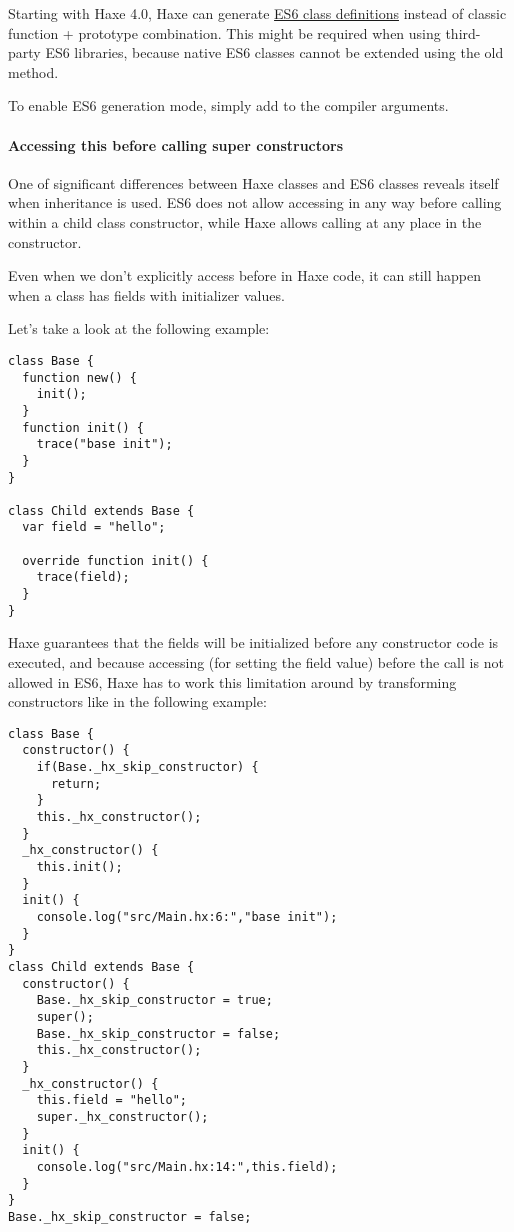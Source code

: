 
Starting with Haxe 4.0, Haxe can generate \href{https://developer.mozilla.org/en-US/docs/Web/JavaScript/Reference/Classes}{ES6 class definitions} instead of classic function + prototype combination. This might be required when using third-party ES6 libraries, because native ES6 classes cannot be extended using the old method.

To enable ES6 generation mode, simply add  to the compiler arguments.

\paragraph{Accessing this before calling super constructors}

One of significant differences between Haxe classes and ES6 classes reveals itself when inheritance is used. ES6 does not allow accessing  in any way before calling  within a child class constructor, while Haxe allows calling  at any place in the constructor.

Even when we don't explicitly access  before  in Haxe code, it can still happen when a class has fields with initializer values.

Let's take a look at the following example:

\begin{lstlisting}
class Base {
  function new() {
    init();
  }
  function init() {
    trace("base init");
  }
}

class Child extends Base {
  var field = "hello";

  override function init() {
    trace(field);
  }
}
\end{lstlisting}

Haxe guarantees that the fields will be initialized before any constructor code is executed, and because accessing  (for setting the field value) before the  call is not allowed in ES6, Haxe has to work this limitation around by transforming constructors like in the following example:

\begin{lstlisting}
class Base {
  constructor() {
    if(Base._hx_skip_constructor) {
      return;
    }
    this._hx_constructor();
  }
  _hx_constructor() {
    this.init();
  }
  init() {
    console.log("src/Main.hx:6:","base init");
  }
}
class Child extends Base {
  constructor() {
    Base._hx_skip_constructor = true;
    super();
    Base._hx_skip_constructor = false;
    this._hx_constructor();
  }
  _hx_constructor() {
    this.field = "hello";
    super._hx_constructor();
  }
  init() {
    console.log("src/Main.hx:14:",this.field);
  }
}
Base._hx_skip_constructor = false;
\end{lstlisting}

